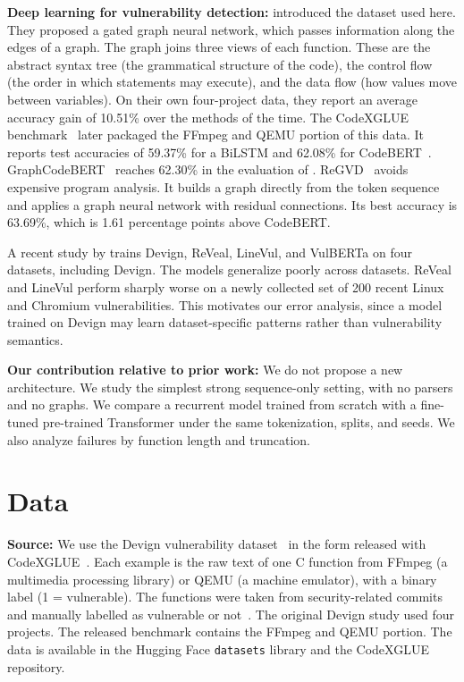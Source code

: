 \documentclass{article}
\begin{document}
\textbf{Deep learning for vulnerability detection:}
\citet{zhou2019devign} introduced the dataset used here. They proposed a gated graph neural network, which passes information along the edges of a graph. The graph joins three views of each function. These are the abstract syntax tree (the grammatical structure of the code), the control flow (the order in which statements may execute), and the data flow (how values move between variables). On their own four-project data, they report an average accuracy gain of 10.51\% over the methods of the time.
The CodeXGLUE benchmark~\citep{lu2021codexglue} later packaged the FFmpeg and QEMU portion of this data. It reports test accuracies of 59.37\% for a BiLSTM and 62.08\% for CodeBERT~\citep{feng2020codebert}. GraphCodeBERT~\citep{guo2021graphcodebert} reaches 62.30\% in the evaluation of \citet{nguyen2022regvd}.
ReGVD~\citep{nguyen2022regvd} avoids expensive program analysis. It builds a graph directly from the token sequence and applies a graph neural network with residual connections. Its best accuracy is 63.69\%, which is 1.61 percentage points above CodeBERT.

A recent study by \citet{labtoreality2025} trains Devign, ReVeal, LineVul, and VulBERTa on four datasets, including Devign. The models generalize poorly across datasets. ReVeal and LineVul perform sharply worse on a newly collected set of 200 recent Linux and Chromium vulnerabilities. This motivates our error analysis, since a model trained on Devign may learn dataset-specific patterns rather than vulnerability semantics.

\textbf{Our contribution relative to prior work:}
We do not propose a new architecture. We study the simplest strong sequence-only setting, with no parsers and no graphs. We compare a recurrent model trained from scratch with a fine-tuned pre-trained Transformer under the same tokenization, splits, and seeds. We also analyze failures by function length and truncation.

\section{Data}\label{sec:data}

\textbf{Source:}
We use the Devign vulnerability dataset~\citep{zhou2019devign} in the form released with CodeXGLUE~\citep{lu2021codexglue}.
Each example is the raw text of one C function from FFmpeg (a multimedia processing library) or QEMU (a machine emulator), with a binary label (1 = vulnerable).
The functions were taken from security-related commits and manually labelled as vulnerable or not~\citep{zhou2019devign}. The original Devign study used four projects. The released benchmark contains the FFmpeg and QEMU portion.
The data is available in the Hugging Face \texttt{datasets} library and the CodeXGLUE repository.
\end{document}
